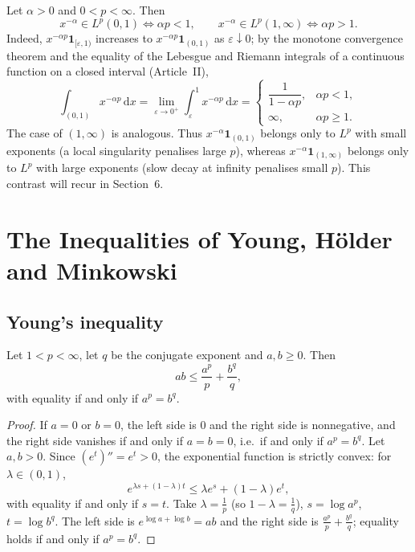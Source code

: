 \documentclass[11pt]{article}
\newcommand{\dx}{\,\mathrm{d}x}
\newcommand{\ind}{\mathbf{1}}
\begin{document}
\begin{example}\label{ex:power}
Let $\alpha>0$ and $0<p<\infty$. Then
\[
x^{-\alpha}\in L^{p}(0,1)\iff \alpha p<1,\qquad x^{-\alpha}\in L^{p}(1,\infty)\iff \alpha p>1 .
\]
Indeed, $x^{-\alpha p}\ind_{[\varepsilon,1)}$ increases to $x^{-\alpha p}\ind_{(0,1)}$ as $\varepsilon\downarrow0$; by the monotone convergence theorem and the equality of the Lebesgue and Riemann integrals of a continuous function on a closed interval (Article~II),
\[
\int_{(0,1)}x^{-\alpha p}\dx=\lim_{\varepsilon\to0^{+}}\int_{\varepsilon}^{1}x^{-\alpha p}\dx=\begin{cases}\dfrac{1}{1-\alpha p},&\alpha p<1,\\[2mm] \infty,&\alpha p\ge1.\end{cases}
\]
The case of $(1,\infty)$ is analogous. Thus $x^{-\alpha}\ind_{(0,1)}$ belongs only to $L^{p}$ with small exponents (a local singularity penalises large $p$), whereas $x^{-\alpha}\ind_{(1,\infty)}$ belongs only to $L^{p}$ with large exponents (slow decay at infinity penalises small $p$). This contrast will recur in Section~6.
\end{example}

\section{The Inequalities of Young, Hölder and Minkowski}

\subsection{Young's inequality}

\begin{lemma}\label{lem:young}
Let $1<p<\infty$, let $q$ be the conjugate exponent and $a,b\ge0$. Then
\[
ab\le\frac{a^{p}}{p}+\frac{b^{q}}{q},
\]
with equality if and only if $a^{p}=b^{q}$.
\end{lemma}

\begin{proof}
If $a=0$ or $b=0$, the left side is $0$ and the right side is nonnegative, and the right side vanishes if and only if $a=b=0$, i.e.\ if and only if $a^{p}=b^{q}$. Let $a,b>0$. Since $(e^{t})''=e^{t}>0$, the exponential function is strictly convex: for $\lambda\in(0,1)$,
\[
e^{\lambda s+(1-\lambda)t}\le\lambda e^{s}+(1-\lambda)e^{t},
\]
with equality if and only if $s=t$. Take $\lambda=\frac1p$ (so $1-\lambda=\frac1q$), $s=\log a^{p}$, $t=\log b^{q}$. The left side is $e^{\log a+\log b}=ab$ and the right side is $\frac{a^{p}}{p}+\frac{b^{q}}{q}$; equality holds if and only if $a^{p}=b^{q}$.
\end{proof}
\end{document}
